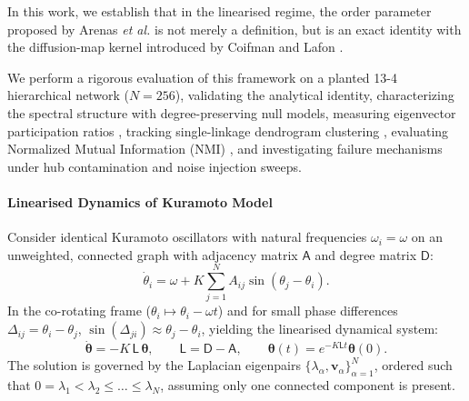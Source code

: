 \documentclass[twocolumn,aps,prl,superscriptaddress,nofootinbib]{revtex4-2}
\theoremstyle{plain}
\theoremstyle{definition}
\newcommand{\Lap}{\mathsf{L}}
\newcommand{\Adj}{\mathsf{A}}
\newcommand{\Deg}{\mathsf{D}}
\begin{document}
In this work, we establish that in the linearised regime, the order parameter proposed by Arenas \textit{et al.} is not merely a definition, but is an exact identity with the diffusion-map kernel introduced by Coifman and Lafon \cite{coifman2006}.

We perform a rigorous evaluation of this framework on a planted 13-4 hierarchical network ($N=256$), validating the analytical identity, characterizing the spectral structure with degree-preserving null models, measuring eigenvector participation ratios \cite{pradhan2017}, tracking single-linkage dendrogram clustering \cite{sibson1973}, evaluating Normalized Mutual Information (NMI) \cite{danon2005}, and investigating failure mechanisms under hub contamination and noise injection sweeps.


\paragraph{Linearised Dynamics of Kuramoto Model}
Consider identical Kuramoto oscillators with natural frequencies $\omega_i = \omega$ on an unweighted, connected graph with adjacency matrix $\Adj$ and degree matrix $\Deg$:
\begin{equation}
\dot{\theta}_i = \omega + K \sum_{j=1}^N A_{ij} \sin(\theta_j - \theta_i).
\label{eq:kuramoto_intro}
\end{equation}
In the co-rotating frame ($\theta_i \mapsto \theta_i - \omega t$) and for small phase differences $\Delta_{ij} = \theta_i - \theta_j$, $\sin(\Delta_{ji}) \approx \theta_j - \theta_i$, yielding the linearised dynamical system:
\begin{equation}
\dot{\bm\theta} = -K\,\Lap\,\bm\theta,
\qquad \Lap=\Deg-\Adj,
\qquad \bm\theta(t)=e^{-K\Lap t}\bm\theta(0).
\label{eq:heat}
\end{equation}
The solution is governed by the Laplacian eigenpairs $\{\lambda_\alpha, \bm v_\alpha\}_{\alpha=1}^N$, ordered such that $0 = \lambda_1 < \lambda_2 \le \dots \le \lambda_N$, assuming only one connected component is present.
\end{document}
